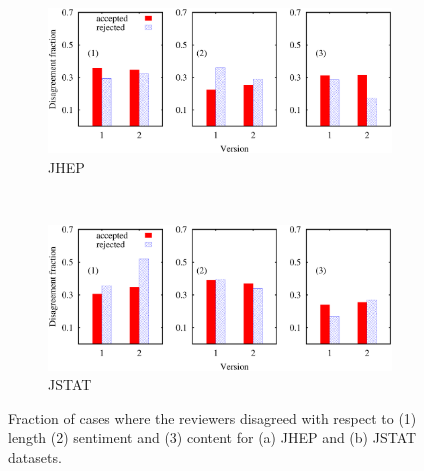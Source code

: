 \begin{figure}[!ht]
 \centering
 \begin{subfigure}[b]{0.49\textwidth}
 \centering
  \includegraphics[scale = 0.28]{figures/jhep_all.eps}
  \caption{\label{disagree:jhep}JHEP}
 \end{subfigure}%
 ~
 \begin{subfigure}[b]{0.49\textwidth}
 \centering
  \includegraphics[scale = 0.28]{figures/jstat_all.eps}
  \caption{\label{disagree:jstat}JSTAT}
 \end{subfigure}

 \caption{ Fraction of cases where the reviewers disagreed with respect to (1) length (2) sentiment and (3) content for (a) JHEP and (b) JSTAT 
  datasets.\vspace{-4mm}}
  
\end{figure}


\medskip
